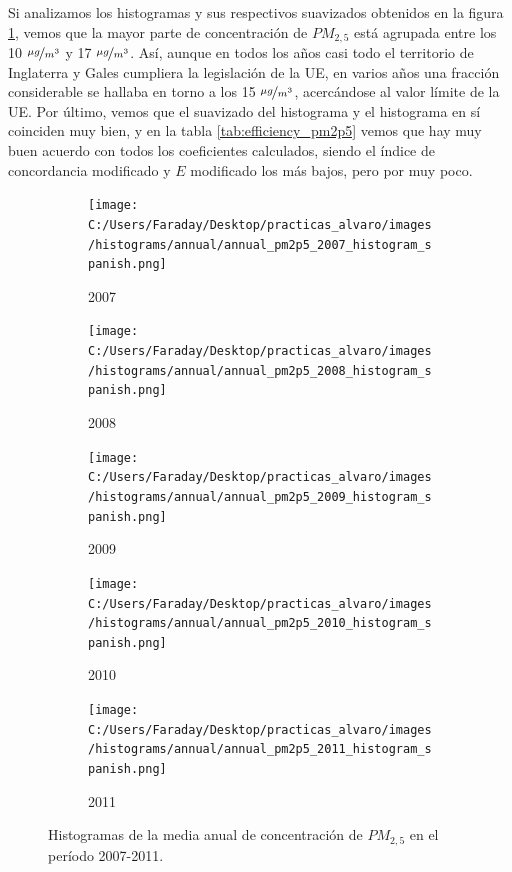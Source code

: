 \documentclass[12pt]{article}
\begin{document}
Si analizamos los histogramas y sus respectivos suavizados obtenidos en la figura \ref{fig:hist-pm2p5-anual}, vemos que la mayor parte de concentración de $PM_{2,5}$ está agrupada entre los 10 $\nicefrac{\mu g}{m^{3}}$ y 17 $\nicefrac{\mu g}{m^{3}}$. Así, aunque en todos los años casi todo el territorio de Inglaterra y Gales cumpliera la legislación de la UE,  en varios años una fracción considerable se hallaba en torno a los 15 $\nicefrac{\mu g}{m^{3}}$, acercándose al valor límite de la UE. Por último, vemos que el suavizado del histograma y el histograma en sí coinciden muy bien, y en la tabla \ref{tab:efficiency_pm2p5} vemos que hay muy buen acuerdo con todos los coeficientes calculados, siendo el índice de concordancia modificado y $E$ modificado los más bajos, pero por muy poco.

\begin{figure}[H]

\centering
\begin{subfigure}[H]{0.45\textwidth}
\texttt{[image: C:/Users/Faraday/Desktop/practicas\_alvaro/images/histograms/annual/annual\_pm2p5\_2007\_histogram\_spanish.png]}
\captionsetup{labelformat=empty}
\caption{2007}
\end{subfigure}
%
\begin{subfigure}[H]{0.45\textwidth}
\texttt{[image: C:/Users/Faraday/Desktop/practicas\_alvaro/images/histograms/annual/annual\_pm2p5\_2008\_histogram\_spanish.png]}
\captionsetup{labelformat=empty}
\caption{2008}
\end{subfigure}

\begin{subfigure}[H]{0.45\textwidth}
\texttt{[image: C:/Users/Faraday/Desktop/practicas\_alvaro/images/histograms/annual/annual\_pm2p5\_2009\_histogram\_spanish.png]}
\captionsetup{labelformat=empty}
\caption{2009}
\end{subfigure}
%
\begin{subfigure}[H]{0.45\textwidth}
\texttt{[image: C:/Users/Faraday/Desktop/practicas\_alvaro/images/histograms/annual/annual\_pm2p5\_2010\_histogram\_spanish.png]}
\captionsetup{labelformat=empty}
\caption{2010}
\end{subfigure}

\begin{subfigure}[H]{0.45\textwidth}
\texttt{[image: C:/Users/Faraday/Desktop/practicas\_alvaro/images/histograms/annual/annual\_pm2p5\_2011\_histogram\_spanish.png]}
\captionsetup{labelformat=empty}
\caption{2011}
\end{subfigure}

\vspace*{-3mm}
\caption{Histogramas de la media anual de concentración de $PM_{2,5}$ en el período 2007-2011.}
\label{fig:hist-pm2p5-anual}
\end{figure}
\end{document}
